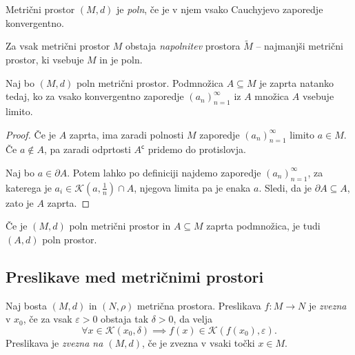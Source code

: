 \documentclass[12pt, a4paper]{article}
\begin{document}
\obvs

\begin{definicija}
Metrični prostor $(M,d)$ je \emph{poln}, če je v njem vsako Cauchyjevo zaporedje konvergentno.
\end{definicija}

\begin{opomba}
Za vsak metrični prostor $M$ obstaja \emph{napolnitev} prostora $\widetilde{M}$ -- najmanjši metrični prostor, ki vsebuje $M$ in je poln.
\end{opomba}

\begin{trditev}
Naj bo $(M,d)$ poln metrični prostor. Podmnožica $A\subseteq M$ je zaprta natanko tedaj, ko za vsako konvergentno zaporedje $(a_n)_{n=1}^\infty$ iz $A$ množica $A$ vsebuje limito.
\end{trditev}

\begin{proof}
Če je $A$ zaprta, ima zaradi polnosti $M$ zaporedje $(a_n)_{n=1}^\infty$ limito $a\in M$. Če $a\not\in A$, pa zaradi odprtosti $A^\mathsf{c}$ pridemo do protislovja.

Naj bo $a\in\partial A$. Potem lahko po definiciji najdemo zaporedje $(a_n)_{n=1}^\infty$, za katerega je $a_i\in\mathcal{K}\left(a,\frac{1}{n}\right)\cap A$, njegova limita pa je enaka $a$. Sledi, da je $\partial A\subseteq A$, zato je $A$ zaprta.
\end{proof}

\begin{posledica}
Če je $(M,d)$ poln metrični prostor in $A\subseteq M$ zaprta podmnožica, je tudi $(A,d)$ poln prostor.
\end{posledica}

\newpage

\subsection{Preslikave med metričnimi prostori}

\begin{okvir}
\begin{definicija}
Naj bosta $(M,d)$ in $(N,\rho)$ metrična prostora. Preslikava $f\colon M\to N$ je \emph{zvezna} v $x_0$, če za vsak $\varepsilon>0$ obstaja tak $\delta>0$, da velja
\[
\forall x\in\mathcal{K}(x_0,\delta)\implies f(x)\in\mathcal{K}(f(x_0),\varepsilon).
\]
Preslikava je \emph{zvezna na $(M,d)$}, če je zvezna v vsaki točki $x\in M$.
\end{definicija}
\end{okvir}
\end{document}
